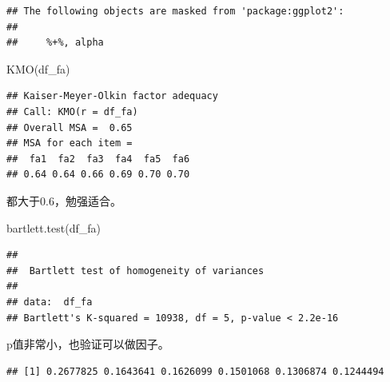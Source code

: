 \documentclass[
  oneside]{book}
\newenvironment{Shaded}{\begin{snugshade}}{\end{snugshade}}
\newcommand{\AttributeTok}[1]{\textcolor[rgb]{0.77,0.63,0.00}{#1}}
\newcommand{\CommentTok}[1]{\textcolor[rgb]{0.56,0.35,0.01}{\textit{#1}}}
\newcommand{\FunctionTok}[1]{\textcolor[rgb]{0.00,0.00,0.00}{#1}}
\newcommand{\NormalTok}[1]{#1}
\newcommand{\OtherTok}[1]{\textcolor[rgb]{0.56,0.35,0.01}{#1}}
\newcommand{\SpecialCharTok}[1]{\textcolor[rgb]{0.00,0.00,0.00}{#1}}
\begin{document}
\begin{verbatim}
## The following objects are masked from 'package:ggplot2':
## 
##     %+%, alpha
\end{verbatim}

\begin{Shaded}
\begin{Highlighting}[]
\FunctionTok{KMO}\NormalTok{(df\_fa)}
\end{Highlighting}
\end{Shaded}

\begin{verbatim}
## Kaiser-Meyer-Olkin factor adequacy
## Call: KMO(r = df_fa)
## Overall MSA =  0.65
## MSA for each item = 
##  fa1  fa2  fa3  fa4  fa5  fa6 
## 0.64 0.64 0.66 0.69 0.70 0.70
\end{verbatim}

都大于0.6，勉强适合。

\begin{Shaded}
\begin{Highlighting}[]
\FunctionTok{bartlett.test}\NormalTok{(df\_fa)}
\end{Highlighting}
\end{Shaded}

\begin{verbatim}
## 
##  Bartlett test of homogeneity of variances
## 
## data:  df_fa
## Bartlett's K-squared = 10938, df = 5, p-value < 2.2e-16
\end{verbatim}

p值非常小，也验证可以做因子。

\begin{Shaded}
\end{Shaded}

\begin{verbatim}
## [1] 0.2677825 0.1643641 0.1626099 0.1501068 0.1306874 0.1244494
\end{verbatim}

\begin{Shaded}
\end{Shaded}
\end{document}
